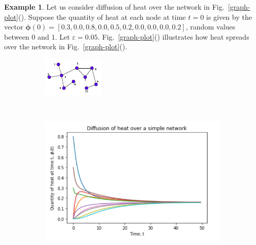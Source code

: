 \documentclass[10pt,a4paper]{article}
\theoremstyle{plain}
\theoremstyle{definition}
\newtheorem{exa}[subsection]{Example}
\begin{document}
    	 \begin{exa} Let us consider diffusion of heat over the network in Fig.~\ref{graph-plot}(). Suppose the quantity of heat at each node at time $t=0$ is given by the vector $\boldsymbol{\phi}(0)= [0.3,0.0,0.8,0.0,0.5,0.2,0.0,0.0,0.0,0.2]$, random values between $0$ and $1$. Let $\varepsilon=0.05$. Fig.~\ref{graph-plot}() illustrates how heat spreads over the network in Fig.~\ref{graph-plot}(). 
    	 	
    	 	\begin{figure}[H]
    	 		\centering
    	 		\begin{subfigure}[b]{0.29\textwidth}
    	 			\includegraphics[width=\textwidth]{images/diffusion-graph.pdf}
    	 			\caption{}
    	 			\label{difn-graph}
    	 		\end{subfigure}~
    	 		\begin{subfigure}[b]{0.45\textwidth}
    	 			\includegraphics[width= \textwidth]{images/Diffusion-on-network-new.png}

\end{subfigure}
\end{figure}
\end{exa}
\end{document}

